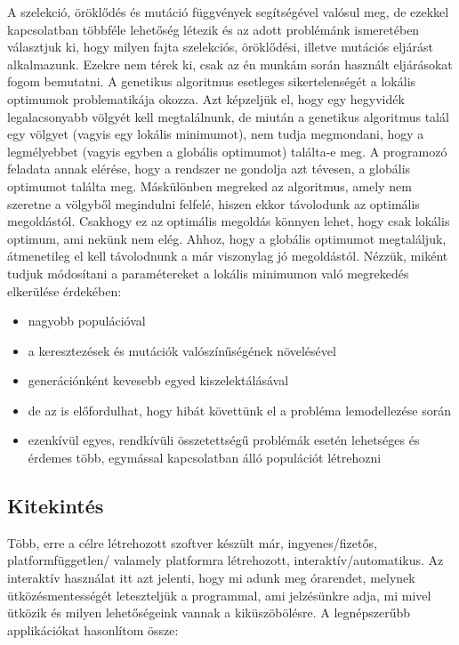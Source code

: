 \documentclass[a4paper,12pt]{article}
\begin{document}
A szelekció, öröklődés és mutáció függvények segítségével valósul meg, de ezekkel
kapcsolatban többféle lehetőség létezik és az adott problémánk ismeretében választjuk ki,
hogy milyen fajta szelekciós, öröklődési, illetve mutációs eljárást alkalmazunk. Ezekre nem
térek ki, csak az én munkám során használt eljárásokat fogom bemutatni.
A genetikus algoritmus esetleges sikertelenségét a lokális optimumok problematikája okozza. 
Azt képzeljük el, hogy egy hegyvidék legalacsonyabb völgyét kell megtalálnunk, de miután a
genetikus algoritmus talál egy völgyet (vagyis egy lokális minimumot), nem tudja megmondani,
hogy a legmélyebbet (vagyis egyben a globális optimumot) találta-e meg. A programozó feladata
annak elérése, hogy a rendszer ne gondolja azt tévesen, a globális optimumot találta meg. 
Máskülönben megreked az algoritmus, amely nem szeretne a völgyből megindulni felfelé, hiszen 
ekkor távolodunk az optimális megoldástól. Csakhogy ez az optimális megoldás könnyen lehet,
hogy csak lokális optimum, ami nekünk nem elég. Ahhoz, hogy a globális optimumot megtaláljuk,
átmenetileg el kell távolodnunk a már viszonylag jó megoldástól. Nézzük, miként tudjuk
módosítani a paramétereket a lokális minimumon való megrekedés elkerülése érdekében:

\begin{itemize}
    \item nagyobb populációval
    \item a keresztezések és mutációk valószínűségének növelésével
    \item generációnként kevesebb egyed kiszelektálásával
    \item de az is előfordulhat, hogy hibát követtünk el a probléma lemodellezése során
    \item ezenkívül egyes, rendkívüli összetettségű problémák esetén lehetséges és érdemes                 több, egymással kapcsolatban álló populációt létrehozni
\end{itemize}

\subsection{Kitekintés}

Több, erre a célre létrehozott szoftver készült már, ingyenes/fizetős, platformfüggetlen/
valamely platformra létrehozott, interaktív/automatikus. Az interaktív használat itt azt
jelenti, hogy mi adunk meg órarendet, melynek ütközésmentességét leteszteljük a programmal,
ami jelzésünkre adja, mi mivel ütközik és milyen lehetőségeink vannak a kiküszöbölésre. 
A legnépszerűbb applikációkat hasonlítom össze:
\end{document}
